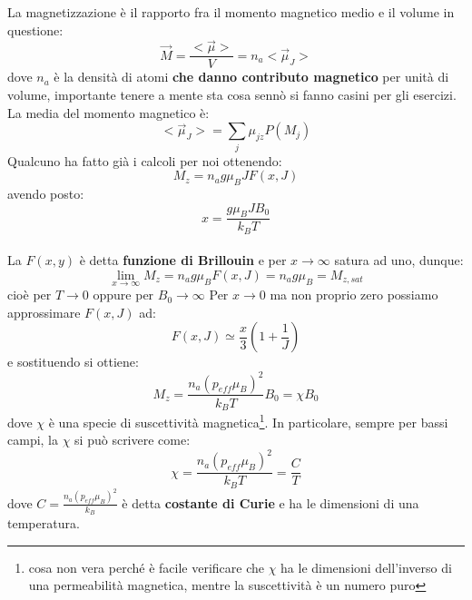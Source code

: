 \documentclass{book}
\begin{document}
     La magnetizzazione è il rapporto fra il momento magnetico medio e il volume in questione:
     \begin{equation}
         \vec{M} = \frac{<\vec{\mu}>}{V} = n_{a} <\vec{\mu}_{J}>
     \end{equation}
     dove $n_{a}$ è la densità di atomi \textbf{che danno contributo magnetico} per unità di volume, importante tenere a mente sta cosa sennò si fanno casini per gli esercizi. La media del momento magnetico è:
     \begin{equation}
         <\vec{\mu}_{J}> = \sum_{j}  \mu_{jz}P(M_{j})
     \end{equation}
     Qualcuno ha fatto già i calcoli per noi ottenendo:
     \begin{equation}
         M_{z} = n_{a} g \mu_{B}JF(x,J)
     \end{equation}
     avendo posto:
     \begin{equation}
         x=\frac{g \mu_{B}JB_{0}}{k_{B}T}
     \end{equation} \\
     La $F(x,y)$ è detta \textbf{funzione di Brillouin} e per $x \to \infty$ satura ad uno, dunque:
     \begin{equation}
         \lim_{x \to \infty} M_{z} = n_{a}g\mu_{B}F(x,J) = n_{a}g\mu_{B}=M_{z,sat}
     \end{equation}
     cioè per $T \to 0$ oppure per $B_{0} \to \infty$
     Per $x \to 0$ ma non proprio zero possiamo approssimare $F(x,J)$ ad:
     \begin{equation}
         F(x,J) \simeq  \frac{x}{3}(1+\frac{1}{J})
     \end{equation}
     e sostituendo si ottiene:
     \begin{equation}
         M_{z} = \frac{n_{a} (p_{eff} \mu_{B})^{2}}{k_{B}T}B_{0} = \chi B_{0}
     \end{equation}
     dove $\chi$ è una specie di suscettività magnetica\footnote{cosa non vera perché è facile verificare che $\chi$ ha le dimensioni dell'inverso di una permeabilità magnetica, mentre la suscettività è un numero puro}. In particolare, sempre per bassi campi, la $\chi$ si può scrivere come:
     \begin{equation}
         \chi = \frac{n_{a} (p_{eff} \mu_{B})^{2}}{k_{B}T} = \frac{C}{T}
     \end{equation}
     dove $\displaystyle C=\frac{n_{a} (p_{eff} \mu_{B})^{2}}{k_{B}}$ è detta \textbf{costante di Curie} e ha le dimensioni di una temperatura.
\end{document}
